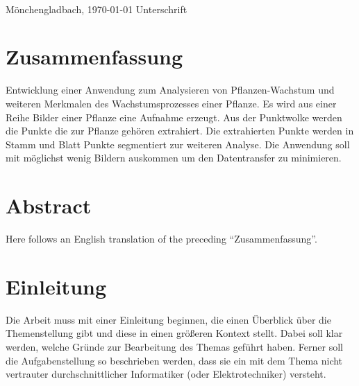 \documentclass[12pt,titlepage,twoside]{article}
\begin{document}
\vspace{8ex}
\begin{tabbing}
\underline{\hspace{14em}} \hspace{3em}\= \underline{\hspace{14em}} \\
Mönchengladbach, \today \> Unterschrift
\end{tabbing}

\newpage

\section*{Zusammenfassung}
Entwicklung einer Anwendung zum Analysieren von Pflanzen-Wachstum und weiteren Merkmalen des Wachstumsprozesses einer Pflanze. Es wird aus einer Reihe Bilder einer Pflanze eine Aufnahme erzeugt. 
Aus der Punktwolke werden die Punkte die zur Pflanze gehören extrahiert. Die extrahierten Punkte werden in Stamm und Blatt Punkte segmentiert zur weiteren Analyse. 
Die Anwendung soll mit möglichst wenig Bildern auskommen um den Datentransfer zu minimieren. 

\setcounter{page}{1}
\section*{Abstract}
Here follows an English translation of the preceding
``Zusammenfassung''.

\newpage

\pagestyle{plain}
\tableofcontents
\newpage

\renewcommand{\labelenumi}{\alph{enumi})} 



\section{Einleitung}
\label{sec:einleitung}
Die Arbeit muss mit einer Einleitung beginnen, die einen Überblick über die
Themenstellung gibt und diese in einen größeren Kontext stellt. Dabei soll
klar werden, welche Gründe zur Bearbeitung des Themas geführt
haben. Ferner soll die Aufgabenstellung so beschrieben werden, dass
sie ein mit dem Thema nicht vertrauter durchschnittlicher Informatiker
(oder Elektrotechniker) versteht.
\end{document}
